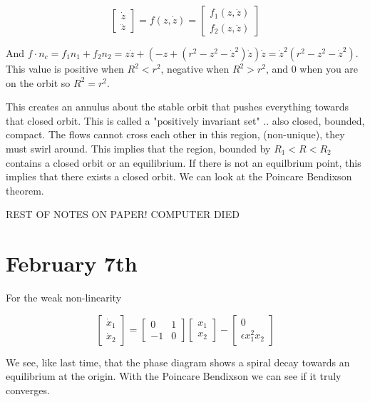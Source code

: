 \documentclass[11pt]{article}
\begin{document}
\begin{equation}
\begin{bmatrix}
\dot{z} \\
\ddot{z}
\end{bmatrix}
= f(z,\dot{z}) = 
\begin{bmatrix}
f_1(z,\dot{z}) \\
f_2(z,\ddot{z})
\end{bmatrix}
\end{equation}

And $f \cdot n_c = f_1n_1 + f_2n_2 = z\dot{z} + (-z+(r^2-z^2-\dot{z}^2)\dot{z})\dot{z} = \dot{z}^2(r^2 - z^2 -\dot{z}^2)$. This value is positive when $R^2 < r^2$, negative when $R^2 > r^2$, and 0 when you are on the orbit so $R^2 = r^2$.

This creates an annulus about the stable orbit that pushes everything towards that closed orbit. This is called a "positively invariant set" .. also closed, bounded, compact. The flows cannot cross each other in this region, (non-unique), they must swirl around. This implies that the region, bounded by $R_1<R<R_2$ contains a closed orbit or an equilibrium. If there is not an equilbrium point, this implies that there exists a closed orbit. We can look at the Poincare Bendixson theorem. 


REST OF NOTES ON PAPER! COMPUTER DIED 

\section*{February 7th}

For the weak non-linearity

\begin{equation}
\begin{bmatrix}
\dot{x}_1 \\
\dot{x}_2
\end{bmatrix} =
\begin{bmatrix}
0 &1 \\
-1 &0
\end{bmatrix}
\begin{bmatrix}
x_1 \\
x_2
\end{bmatrix}-\begin{bmatrix}
0\\
\epsilon x_1^2x_2
\end{bmatrix}
\end{equation}

We see, like last time, that the phase diagram shows a spiral decay towards an equilibrium at the origin. With the Poincare Bendixson we can see if it truly converges.
\end{document}
